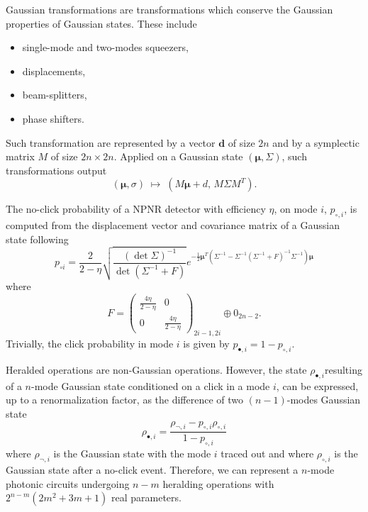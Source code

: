 Gaussian transformations are transformations which conserve the Gaussian properties of Gaussian states. 
These include
\begin{itemize}
	\item single-mode and two-modes squeezers,
	\item displacements,
	\item beam-splitters,
	\item phase shifters.
\end{itemize}
Such transformation are represented by a vector $\mathbf{d}$ of size $2n$ and by a symplectic matrix $M$ of size $2n\times2n$.
Applied on a Gaussian state $(\mathbf{\mu},\Sigma)$, such transformations output
\begin{equation}
	(\mathbf{\mu},\sigma)\; \mapsto\; (M\mathbf{\mu} + d,\, M\Sigma M^T).
\end{equation}

The no-click probability of a NPNR detector with efficiency $\eta$, on mode $i$, $p_{\circ,i}$, is computed from the displacement vector and covariance matrix of a Gaussian state following
\begin{equation}
p_{\circ i} =\frac{2}{2-\eta}\sqrt{\frac{(\det \Sigma)^{-1}}{ \det(\Sigma^{-1}+F)}}
e^{-\frac{1}{2}{\mathbf{\mu} }^T\left( \Sigma^{-1} - \Sigma^{-1} (\Sigma^{-1}+F)^{-1} \Sigma^{-1} \right){\mathbf{\mu} }}
\end{equation}
where
\begin{equation}
F= \left(\begin{array}{cc}
    \frac{4\eta}{2-\eta} & 0 \\
    0 & \frac{4\eta}{2-\eta}
    \end{array}\right)_{2i-1,2i} \oplus 0_{2n-2}.
\end{equation}
Trivially, the click probability in mode $i$ is given by $p_{\bullet,i}=1-p_{\circ,i}$.

Heralded operations are non-Gaussian operations.
However, the state $\rho_{\bullet,i}$resulting of a $n$-mode Gaussian state conditioned on a click in a mode $i$, can be expressed, up to a renormalization factor, as the difference of two $(n-1)$-modes Gaussian state
\begin{equation}
    \rho_{\bullet,i} = \frac{\rho_{\lnot,i} - p_{\circ,i} \rho_{\circ,i}}{1 - p_{\circ,i}}
\end{equation}
where $\rho_{\lnot,i}$ is the Gaussian state with the mode $i$ traced out and where $\rho_{\circ,i}$ is the Gaussian state after a no-click event.
Therefore, we can represent a $n$-mode photonic circuits undergoing $n-m$ heralding operations with $2^{n-m}(2m^2+3m+1)$ real parameters.


